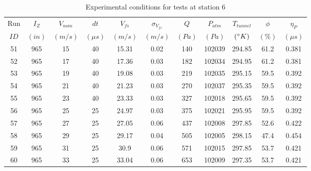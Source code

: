 \begin{table}[H]
\begin{center}
\begin{tabular}{|ccccccccccc|}
	\hline
	Run & $I_Z$ & $V_{nom}$ & $dt$ & $V_{fs}$ & $\sigma_{V_{fs}}$ & $Q$ & $P_{atm}$ & $T_{tunnel}$ & $\phi$ & $\eta_P$\\
	$ID$ & $(in)$ & $(m/s)$ & $(\mu s)$ & $(m/s)$ & $(m/s)$ & $(Pa)$ & $(Pa)$ & $(\degree K)$ & $(\%)$ & $(\mu s)$\\
	\hline
	51 & 965 & 15 & 40 & 15.31 & 0.02 & 140 & 102039 & 294.85 & 61.2 & 0.381\\
	52 & 965 & 17 & 40 & 17.36 & 0.03 & 182 & 102034 & 294.95 & 61.2 & 0.381\\
	53 & 965 & 19 & 40 & 19.08 & 0.03 & 219 & 102035 & 295.15 & 59.5 & 0.392\\
	54 & 965 & 21 & 40 & 21.23 & 0.03 & 270 & 102037 & 295.35 & 59.5 & 0.392\\
	55 & 965 & 23 & 40 & 23.33 & 0.03 & 327 & 102018 & 295.65 & 59.5 & 0.392\\
	56 & 965 & 25 & 25 & 24.97 & 0.03 & 375 & 102021 & 295.95 & 59.5 & 0.392\\
	57 & 965 & 27 & 25 & 27.05 & 0.06 & 437 & 102008 & 297.85 & 52.6 & 0.422\\
	58 & 965 & 29 & 25 & 29.17 & 0.04 & 505 & 102005 & 298.15 & 47.4 & 0.454\\
	59 & 965 & 31 & 25 & 30.9 & 0.06 & 571 & 102015 & 297.85 & 53.7 & 0.421\\
	60 & 965 & 33 & 25 & 33.04 & 0.06 & 653 & 102009 & 297.35 & 53.7 & 0.421\\
	\hline
\end{tabular}
\caption{Experimental conditions for tests at station 6}
\label{table:station_6_measurements.}
\end{center}
\end{table}
